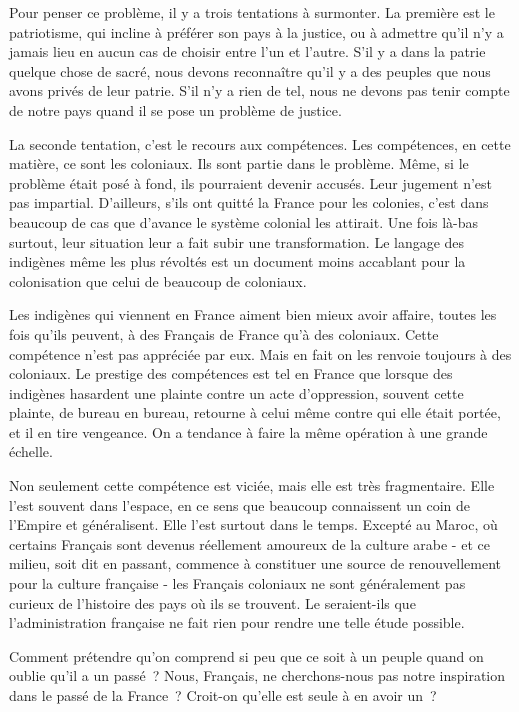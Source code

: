 \documentclass[french,twoside]{book} %
\begin{document}
Pour penser ce problème, il y a trois tentations à surmonter. La première est le patriotisme, qui incline à préférer son pays à la justice, ou à admettre qu'il n'y a jamais lieu en aucun cas de choisir entre l'un et l'autre. S'il y a dans la patrie quelque chose de sacré, nous devons reconnaître qu'il y a des peuples que nous avons privés de leur patrie. S'il n'y a rien de tel, nous ne devons pas tenir compte de notre pays quand il se pose un problème de justice.\par
La seconde tentation, c'est le recours aux compétences. Les compétences, en cette matière, ce sont les coloniaux. Ils sont partie dans le problème. Même, si le problème était posé à fond, ils pourraient devenir accusés. Leur jugement n'est pas impartial. D'ailleurs, s'ils ont quitté la France pour les colonies, c'est dans beaucoup de cas que d'avance le système colonial les attirait. Une fois là-bas surtout, leur situation leur a fait subir une trans­formation. Le langage des indigènes même les plus révoltés est un document moins accablant pour la colonisation que celui de beaucoup de coloniaux.\par
Les indigènes qui viennent en France aiment bien mieux avoir affaire, toutes les fois qu'ils peuvent, à des Français de France qu'à des coloniaux. Cette compétence n'est pas appréciée par eux. Mais en fait on les renvoie toujours à des coloniaux. Le prestige des compétences est tel en France que lorsque des indigènes hasardent une plainte contre un acte d'oppression, souvent cette plainte, de bureau en bureau, retourne à celui même contre qui elle était portée, et il en tire vengeance. On a tendance à faire la même opération à une grande échelle.\par
Non seulement cette compétence est viciée, mais elle est très fragmentaire. Elle l'est souvent dans l'espace, en ce sens que beaucoup connaissent un coin de l'Empire et généralisent. Elle l'est surtout dans le temps. Excepté au Maroc, où certains Français sont devenus réellement amoureux de la culture arabe - et ce milieu, soit dit en passant, commence à constituer une source de renou­vellement pour la culture française - les Français coloniaux ne sont généra­lement pas curieux de l'histoire des pays où ils se trouvent. Le seraient-ils que l'administration française ne fait rien pour rendre une telle étude possible.\par
Comment prétendre qu'on comprend si peu que ce soit à un peuple quand on oublie qu'il a un passé ? Nous, Français, ne cherchons-nous pas notre inspi­ration dans le passé de la France ? Croit-on qu'elle est seule à en avoir un ?\par
\end{document}
